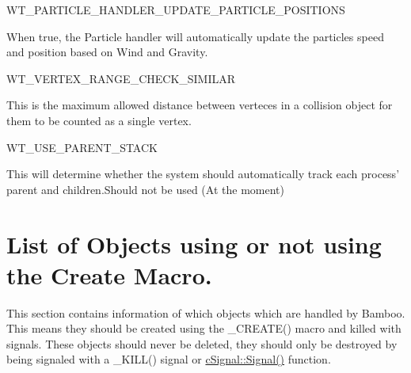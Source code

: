 \begin{DoxyItemize}
\item WT\_\-PARTICLE\_\-HANDLER\_\-UPDATE\_\-PARTICLE\_\-POSITIONS
\begin{DoxyItemize}
\item When true, the Particle handler will automatically update the particles speed and position based on Wind and Gravity.
\end{DoxyItemize}
\end{DoxyItemize}
\begin{DoxyItemize}
\item WT\_\-VERTEX\_\-RANGE\_\-CHECK\_\-SIMILAR
\begin{DoxyItemize}
\item This is the maximum allowed distance between verteces in a collision object for them to be counted as a single vertex.
\end{DoxyItemize}
\end{DoxyItemize}
\begin{DoxyItemize}
\item WT\_\-USE\_\-PARENT\_\-STACK
\begin{DoxyItemize}
\item This will determine whether the system should automatically track each process' parent and children.Should not be used (At the moment)
\end{DoxyItemize}
\end{DoxyItemize}\hypertarget{_reference_lists_ObjectsUsingTheCreateMacro}{}\section{List of Objects using or not using the Create Macro.}\label{_reference_lists_ObjectsUsingTheCreateMacro}
This section contains information of which objects which are handled by Bamboo. This means they should be created using the \_\-CREATE() macro and killed with signals. These objects should never be deleted, they should only be destroyed by being signaled with a \_\-KILL() signal or \hyperlink{classc_signal_a545074be1da41d00050bed3cd2fb2305}{cSignal::Signal()} function.
